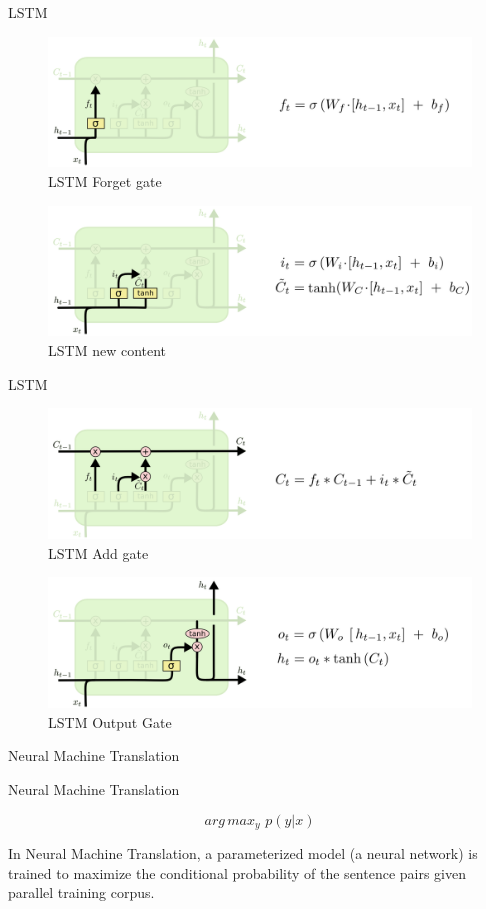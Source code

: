 ﻿\documentclass[table,aspectratio=43,mathserif,xcolor={usenames,dvipsnames,svgnames,table},10pt]{beamer}
\begin{document}
\begin{frame}{LSTM}
 \begin{figure}[h]
    \includegraphics[width=0.6\linewidth]{images/lstm_forget.png}  
    \caption{LSTM Forget gate}
  \end{figure}
   \begin{figure}[h]
    \includegraphics[width=0.6\linewidth]{images/lstm_add.png}  
    \caption{LSTM new content}
  \end{figure}
\end{frame}


\begin{frame}{LSTM}
 \begin{figure}[h]
    \includegraphics[width=0.6\linewidth]{images/lstm_add1.png}  
    \caption{LSTM Add gate}
  \end{figure}
   \begin{figure}[h]
    \includegraphics[width=0.6\linewidth]{images/lstm_output.png}  
    \caption{LSTM Output Gate}
  \end{figure}
\end{frame}


\begin{section}{Neural Machine Translation}
\end{section}

\begin{frame}{Neural Machine Translation}

$$ arg\,max _{y}  \,\, p(y|x)$$
 
 
In Neural Machine Translation, a parameterized model (a neural network) is trained to maximize the conditional probability of the sentence pairs given parallel training corpus.
\end{frame}
\end{document}
